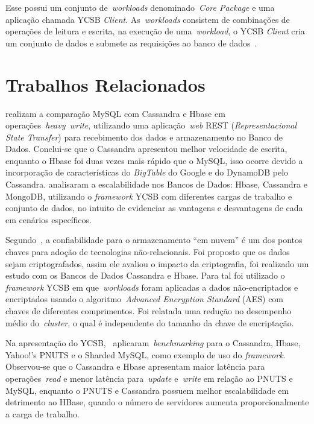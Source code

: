 \documentclass[12pt]{article}
\begin{document}
Esse possui um conjunto de~\emph{workloads} denominado~\emph{Core Package} e uma aplicação chamada YCSB \textit{Client}. 
As~\emph{workloads} consistem de combinações de operações de leitura e escrita, na execução de uma~\emph{workload}, o YCSB \textit{Client} cria um conjunto de dados e submete as requisições ao banco de dados~\cite{cooper2010benchmarking}.

\section{Trabalhos Relacionados} 
\label{sec:relacionados}


\cite{jogi2016performance} realizam a comparação MySQL com Cassandra e Hbase em operações~\emph{heavy~\emph{write}}, utilizando uma aplicação~\emph{web} REST (\emph{Representacional State Transfer}) para recebimento dos dados e armazenamento no Banco de Dados. 
Conclui-se que o Cassandra apresentou melhor velocidade de escrita, enquanto o Hbase foi duas vezes mais rápido que o MySQL, isso ocorre devido a incorporação de características do \emph{BigTable} do Google e do DynamoDB pelo Cassandra. 
\cite{swaminathan2016quantitative} analisaram a escalabilidade nos Bancos de Dados: Hbase, Cassandra e MongoDB, utilizando o \textit{framework} YCSB com diferentes cargas de trabalho e conjunto de dados, no intuito de evidenciar as vantagens e desvantagens de cada em cenários específicos.

Segundo~\cite{waage2014benchmarking}, a confiabilidade para o armazenamento ``em nuvem'' é um dos pontos chaves para adoção de tecnologias não-relacionais. 
Foi proposto que os dados sejam criptografados, assim ele avaliou o impacto da criptografia, foi realizado um estudo com os Bancos de Dados Cassandra e Hbase. 
Para tal foi utilizado o \emph{framework} YCSB em que~\emph{workloads} foram aplicadas a dados não-encriptados e encriptados usando o algoritmo~\emph{Advanced Encryption Standard} (AES) com chaves de diferentes comprimentos. 
Foi relatada uma redução no desempenho médio do~\emph{cluster}, o qual é independente do tamanho da chave de encriptação.

Na apresentação do  YCSB,~\cite{cooper2010benchmarking} aplicaram~\emph{benchmarking} para o Cassandra, Hbase, Yahoo!’s PNUTS e o Sharded MySQL, como exemplo de uso do \textit{framework}. 
Observou-se que o Cassandra e Hbase apresentam maior latência para operações~\emph{read} e menor latência para~\emph{update} e~\emph{write} em relação ao PNUTS e MySQL, enquanto o PNUTS e Cassandra possuem melhor escalabilidade em detrimento ao HBase, quando o número de servidores aumenta proporcionalmente a carga de trabalho.
\end{document}
